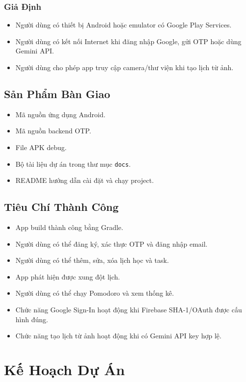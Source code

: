 \documentclass[12pt,a4paper]{report}
\begin{document}
\subsection{Giả Định}

\begin{itemize}
\item Người dùng có thiết bị Android hoặc emulator có Google Play Services.
\item Người dùng có kết nối Internet khi đăng nhập Google, gửi OTP hoặc dùng Gemini API.
\item Người dùng cho phép app truy cập camera/thư viện khi tạo lịch từ ảnh.
\end{itemize}

\section{Sản Phẩm Bàn Giao}

\begin{itemize}
\item Mã nguồn ứng dụng Android.
\item Mã nguồn backend OTP.
\item File APK debug.
\item Bộ tài liệu dự án trong thư mục \texttt{docs}.
\item README hướng dẫn cài đặt và chạy project.
\end{itemize}

\section{Tiêu Chí Thành Công}

\begin{itemize}
\item App build thành công bằng Gradle.
\item Người dùng có thể đăng ký, xác thực OTP và đăng nhập email.
\item Người dùng có thể thêm, sửa, xóa lịch học và task.
\item App phát hiện được xung đột lịch.
\item Người dùng có thể chạy Pomodoro và xem thống kê.
\item Chức năng Google Sign-In hoạt động khi Firebase SHA-1/OAuth được cấu hình đúng.
\item Chức năng tạo lịch từ ảnh hoạt động khi có Gemini API key hợp lệ.
\end{itemize}
\clearpage
\chapter{Kế Hoạch Dự Án}
\end{document}
